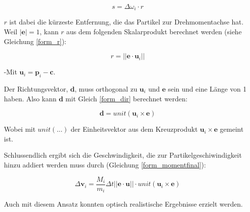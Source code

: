 \begin{equation}
s = \Delta \omega_i \cdot r
\label{form_speed}
\end{equation}

$r$ ist dabei die kürzeste Entfernung, die das Partikel zur Drehmomentachse hat.
Weil $|\textbf{e}|=1$, kann $r$ aus dem folgenden Skalarprodukt berechnet werden (siehe Gleichung \ref{form_r}):

\begin{equation}
r = ||\textbf{e} \cdot \textbf{u}_i||
\label{form_r}
\end{equation}

-Mit $\textbf{u}_i=\textbf{p}_i-\textbf{c}$. 

Der Richtungsvektor, $\textbf{d}$, muss orthogonal zu $\textbf{u}_i$ und $\textbf{e}$ sein und eine Länge von 1 haben. Also kann $\textbf{d}$ mit Gleich \ref{form_dir} berechnet werden:

\begin{equation}
\textbf{d} = unit(\textbf{u}_i \times \textbf{e} )
\label{form_dir}
\end{equation}

Wobei mit $unit(...)$ der Einheitsvektor aus dem Kreuzprodukt $\textbf{u}_i \times \textbf{e} $ gemeint ist.

Schlussendlich ergibt sich die Geschwindigkeit, die zur Partikelgeschiwindigkeit hinzu addiert werden muss durch (Gleichung \ref{form_momentfinal}):

\begin{equation}
\Delta \textbf{v}_i =  \dfrac{M_i}{m_i} \Delta t ||\textbf{e} \cdot \textbf{u}|| \cdot unit(\textbf{u}_i \times \textbf{e} )
\label{form_momentfinal}
\end{equation}

Auch mit diesem Ansatz konnten optisch realistische Ergebnisse erzielt werden.


